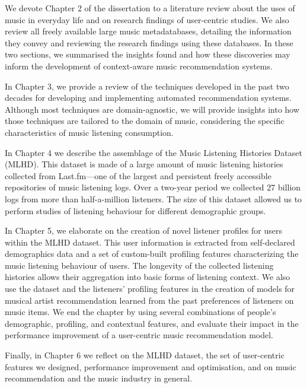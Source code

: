 We devote Chapter 2 of the dissertation to a literature review about the uses of music in everyday life and on research findings of user-centric studies. 
We also review all freely available large music metadatabases, detailing the information they convey and reviewing the research findings using these databases. 
In these two sections, we summarised the insights found and how these discoveries may inform the development of context-aware music recommendation systems. 

In Chapter 3, we  provide a review of the techniques developed in the past two decades for developing and implementing automated recommendation systems. Although most techniques are domain-agnostic, we will provide insights into how those techniques are tailored to the domain of music, considering the specific characteristics of music listening consumption.

In Chapter 4 we describe the assemblage of the Music Listening Histories Dataset (MLHD). This dataset is made of a large amount of music listening histories collected from Last.fm---one of the largest and persistent freely accessible repositories of music listening logs. 
Over a two-year period we collected 27 billion logs from more than half-a-million listeners. The size of this dataset allowed us to perform studies of listening behaviour for different demographic groups. 

In Chapter 5, we elaborate on the creation of novel listener profiles for users within the MLHD dataset. This user information is extracted from self-declared demographics data and a set of custom-built profiling features characterizing the music listening behaviour of users. 
The longevity of the collected listening histories allows their aggregation into basic forms of listening context.
We also use the dataset and the listeners' profiling features in the creation of models for musical artist recommendation learned from the past preferences of listeners on music items. 
We end the chapter by using several combinations of people's demographic, profiling, and contextual features, and evaluate their impact in the performance improvement of a user-centric music recommendation model.

Finally, in Chapter 6 we reflect on the MLHD dataset, the set of user-centric features we designed, performance improvement and optimisation, and on music recommendation and the music industry in general.


